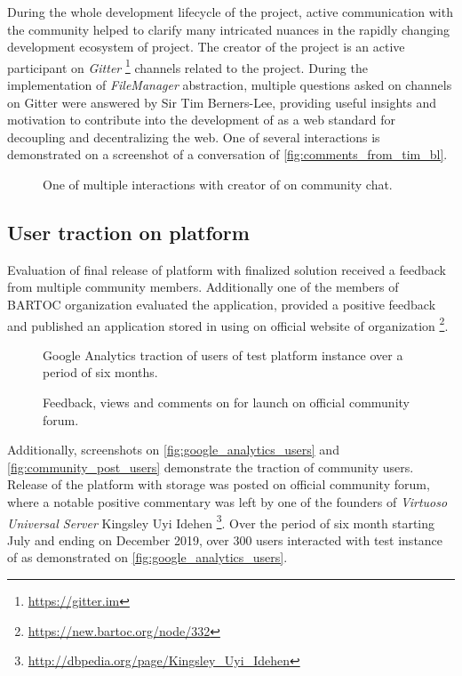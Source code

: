 During the whole development lifecycle of the \lpas{} project, active communication with the community helped to clarify many intricated nuances in the rapidly changing development ecosystem of \solid{} project. The creator of the \solid{} project is an active participant on \textit{Gitter} \footnote{\url{https://gitter.im}} channels related to the project. During the implementation of \textit{FileManager} abstraction, multiple questions asked on \solid{} channels on Gitter were answered by Sir Tim Berners-Lee, providing useful insights and motivation to contribute into the development of \solid{} as a web standard for decoupling and decentralizing the web. One of several interactions is demonstrated on a screenshot of a conversation of \autoref{fig:comments_from_tim_bl}.

\begin{figure}[h]
\centering
{}
\caption{One of multiple interactions with creator of \solid{} on \solid{} community chat.}
\label{fig:comments_from_tim_bl}
\end{figure}

\subsection{User traction on \lpa{} platform}
\label{sssec:user_traction_of_platform}

Evaluation of final release of \lpa{} platform with finalized \lpas{} solution received a feedback from multiple \solid{} community members. Additionally one of the members of \gls{BARTOC} organization evaluated the application, provided a positive feedback and published an application stored in \solid{} using \lpas{} on official website of organization \footnote{\url{https://new.bartoc.org/node/332}}. 

\begin{figure}[hbt]
  \caption{Google Analytics traction of users of test \lpa{} platform instance over a period of six months.}
  \label{fig:google_analytics_users}
\endminipage\hfill
{}
  \caption{Feedback, views and comments on for \lpa{} launch on official \solid{} community forum.}
  \label{fig:community_post_users}
\endminipage\hfill
\end{figure}

Additionally, screenshots on \autoref{fig:google_analytics_users} and \autoref{fig:community_post_users} demonstrate the traction of \solid{} community users. Release of the \lpa{} platform with \lpas{} storage was posted on official \solid{} community forum, where a notable positive commentary was left by one of the founders of \textit{Virtuoso Universal Server} Kingsley Uyi Idehen \footnote{\url{http://dbpedia.org/page/Kingsley_Uyi_Idehen}}. Over the period of six month starting July and ending on December 2019, over 300 users interacted with test instance of \lpa{} as demonstrated on \autoref{fig:google_analytics_users}.